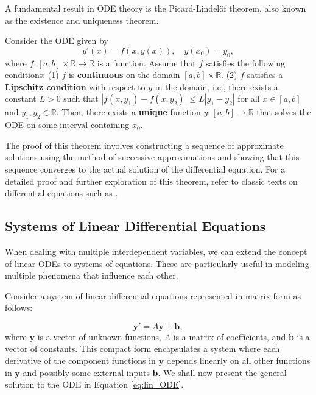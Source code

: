 A fundamental result in ODE theory is the Picard-Lindelöf theorem, also known as the existence and uniqueness theorem.
\begin{theorem}\label{thm:ODE_picard}
Consider the ODE given by
\[
y'(x) = f(x, y(x)), \quad y(x_0) = y_0,
\]
where $f: [a, b] \times \mathbb{R} \rightarrow \mathbb{R}$ is a function. Assume that $f$ satisfies the following conditions: (1) $ f $ is \textbf{continuous} on the domain $ [a, b] \times \mathbb{R} $.
(2) $ f $ satisfies a \textbf{Lipschitz condition} with respect to $ y $ in the domain, i.e., there exists a constant $ L > 0 $ such that
$ 
   |f(x, y_1) - f(x, y_2)| \leq L |y_1 - y_2|
$
   for all $ x \in [a, b] $ and $ y_1, y_2 \in \mathbb{R} $.
Then, there exists a \textbf{unique} function $ y: [a, b] \rightarrow \mathbb{R} $ that solves the ODE on some interval containing $ x_0 $.
\end{theorem}
The proof of this theorem involves constructing a sequence of approximate solutions using the method of successive approximations and showing that this sequence converges to the actual solution of the differential equation.
For a detailed proof and further exploration of this theorem, refer to classic texts on differential equations such as \cite{hirsch2013differential}.

\subsection{Systems of Linear Differential Equations}
When dealing with multiple interdependent variables, we can extend the concept of linear ODEs to systems of equations. These are particularly useful in modeling multiple phenomena that influence each other.

Consider a system of linear differential equations represented in matrix form as follows:

\begin{equation}\label{eq:lin_ODE}    
\mathbf{y}' = A \mathbf{y} + \mathbf{b},
\end{equation}
where $ \mathbf{y} $ is a vector of unknown functions, $ A $ is a matrix of coefficients, and $ \mathbf{b} $ is a vector of constants. This compact form encapsulates a system where each derivative of the component functions in $ \mathbf{y} $ depends linearly on all other functions in $ \mathbf{y} $ and possibly some external inputs $ \mathbf{b} $. We shall now present the general solution to the ODE in Equation \eqref{eq:lin_ODE}.

